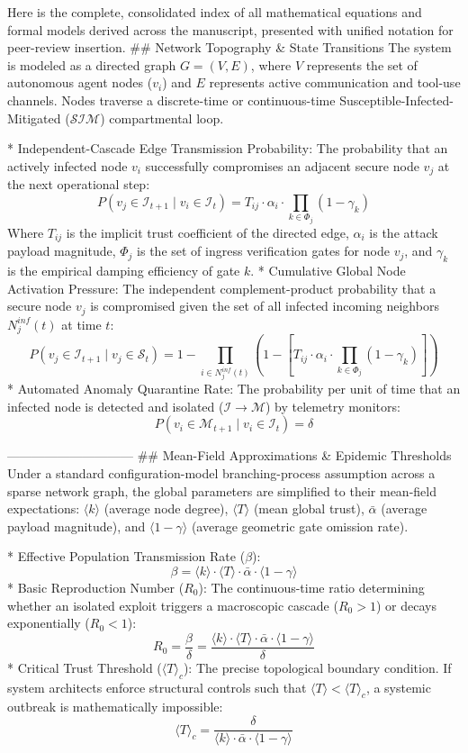 Here is the complete, consolidated index of all mathematical equations and formal models derived across the manuscript, presented with unified notation for peer-review insertion.
## Network Topography & State Transitions
The system is modeled as a directed graph $G = (V, E)$, where $V$ represents the set of autonomous agent nodes ($v_i$) and $E$ represents active communication and tool-use channels.
Nodes traverse a discrete-time or continuous-time Susceptible-Infected-Mitigated ($\mathcal{S}\mathcal{I}\mathcal{M}$) compartmental loop.

* Independent-Cascade Edge Transmission Probability:
The probability that an actively infected node $v_i$ successfully compromises an adjacent secure node $v_j$ at the next operational step:
$$P(v_j \in \mathcal{I}_{t+1} \mid v_i \in \mathcal{I}_t) = T_{ij} \cdot \alpha_i \cdot \prod_{k \in \Phi_j} (1 - \gamma_k)$$ 
Where $T_{ij}$ is the implicit trust coefficient of the directed edge, $\alpha_i$ is the attack payload magnitude, $\Phi_j$ is the set of ingress verification gates for node $v_j$, and $\gamma_k$ is the empirical damping efficiency of gate $k$.
* Cumulative Global Node Activation Pressure:
The independent complement-product probability that a secure node $v_j$ is compromised given the set of all infected incoming neighbors $N^{inf}_j(t)$ at time $t$:
$$P(v_j \in \mathcal{I}_{t+1} \mid v_j \in \mathcal{S}_t) = 1 - \prod_{i \in N^{inf}_j(t)} \left( 1 - \left[ T_{ij} \cdot \alpha_i \cdot \prod_{k \in \Phi_j} (1 - \gamma_k) \right] \right)$$ 
* Automated Anomaly Quarantine Rate:
The probability per unit of time that an infected node is detected and isolated ($\mathcal{I} \to \mathcal{M}$) by telemetry monitors:
$$P(v_i \in \mathcal{M}_{t+1} \mid v_i \in \mathcal{I}_t) = \delta$$ 

------------------------------
## Mean-Field Approximations & Epidemic Thresholds
Under a standard configuration-model branching-process assumption across a sparse network graph, the global parameters are simplified to their mean-field expectations: $\langle k \rangle$ (average node degree), $\langle T \rangle$ (mean global trust), $\bar{\alpha}$ (average payload magnitude), and $\langle 1 - \gamma \rangle$ (average geometric gate omission rate).

* Effective Population Transmission Rate ($\beta$):
$$\beta = \langle k \rangle \cdot \langle T \rangle \cdot \bar{\alpha} \cdot \langle 1 - \gamma \rangle$$ 
* Basic Reproduction Number ($R_0$):
The continuous-time ratio determining whether an isolated exploit triggers a macroscopic cascade ($R_0 > 1$) or decays exponentially ($R_0 < 1$):
$$R_0 = \frac{\beta}{\delta} = \frac{\langle k \rangle \cdot \langle T \rangle \cdot \bar{\alpha} \cdot \langle 1 - \gamma \rangle}{\delta}$$ 
* Critical Trust Threshold ($\langle T \rangle_c$):
The precise topological boundary condition. If system architects enforce structural controls such that $\langle T \rangle < \langle T \rangle_c$, a systemic outbreak is mathematically impossible:
$$\langle T \rangle_c = \frac{\delta}{\langle k \rangle \cdot \bar{\alpha} \cdot \langle 1 - \gamma \rangle}$$ 

